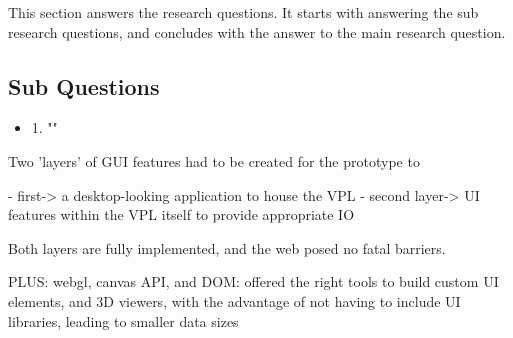 This section answers the research questions. 
It starts with answering the sub research questions, and concludes with the answer to the main research question.

\subsection*{Sub Questions}

\begin{itemize}[ ]
  \item 1. "\myNewSubRQOne"
\end{itemize}




Two 'layers' of \ac{GUI} features had to be created for the prototype to 

- first-> a desktop-looking application to house the VPL
- second layer-> UI features within the VPL itself to provide appropriate IO

Both layers are fully implemented, and the web posed no fatal barriers. 

PLUS: webgl, canvas API, and DOM: offered the right tools to build custom UI elements, and 3D viewers, with the advantage of not having to include UI libraries, leading to smaller data sizes 

